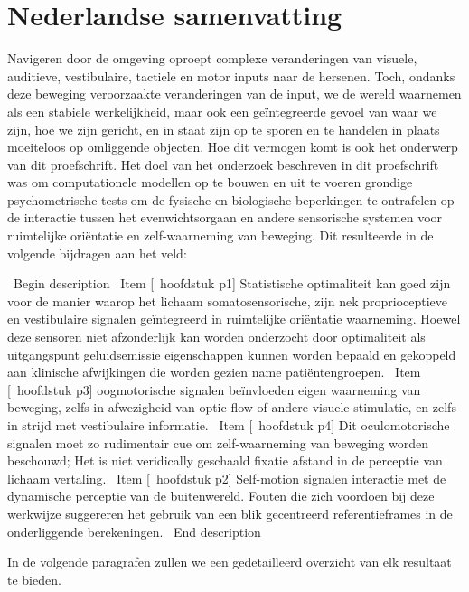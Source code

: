 \clearpage
\pagestyle{empty}

\chapter*{Nederlandse samenvatting}
{}

Navigeren door de omgeving oproept complexe veranderingen van visuele, auditieve, vestibulaire, tactiele en
motor inputs naar de hersenen. Toch, ondanks deze beweging veroorzaakte veranderingen van de input, we de wereld waarnemen als een stabiele werkelijkheid, maar ook een geïntegreerde gevoel van waar we zijn, hoe we zijn gericht, en in staat zijn op te sporen en te handelen in plaats moeiteloos op omliggende objecten. Hoe dit vermogen komt is ook het onderwerp van dit proefschrift. Het doel van het onderzoek beschreven in dit proefschrift was om computationele modellen op te bouwen en uit te voeren grondige psychometrische tests om de fysische en biologische beperkingen te ontrafelen op de interactie tussen het evenwichtsorgaan en andere sensorische systemen voor ruimtelijke oriëntatie en zelf-waarneming van beweging. Dit resulteerde in de volgende bijdragen aan het veld:

\ Begin {description}
\ Item [\ hoofdstuk {p1}] Statistische optimaliteit kan goed zijn voor de manier waarop het lichaam somatosensorische, zijn nek proprioceptieve en vestibulaire signalen geïntegreerd in ruimtelijke oriëntatie waarneming. Hoewel deze sensoren niet afzonderlijk kan worden onderzocht door optimaliteit als uitgangspunt geluidsemissie eigenschappen kunnen worden bepaald en gekoppeld aan klinische afwijkingen die worden gezien name patiëntengroepen.
\ Item [\ hoofdstuk {p3}] oogmotorische signalen beïnvloeden eigen waarneming van beweging, zelfs in afwezigheid van optic flow of andere visuele stimulatie, en zelfs in strijd met vestibulaire informatie.
\ Item [\ hoofdstuk {p4}] Dit oculomotorische signalen moet zo rudimentair cue om zelf-waarneming van beweging worden beschouwd; Het is niet veridically geschaald fixatie afstand in de perceptie van lichaam vertaling.
\ Item [\ hoofdstuk {p2}] Self-motion signalen interactie met de dynamische perceptie van de buitenwereld. Fouten die zich voordoen bij deze werkwijze suggereren het gebruik van een blik gecentreerd referentieframes in de onderliggende berekeningen.
\ End {description}

In de volgende paragrafen zullen we een gedetailleerd overzicht van elk resultaat te bieden.

